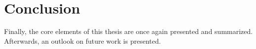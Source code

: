 
\chapter{Conclusion}\label{ord:ch6}

Finally, the core elements of this thesis are once again presented and summarized.
Afterwards, an outlook on future work is presented.


